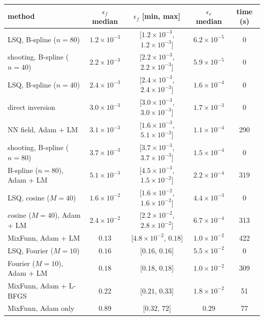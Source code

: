 \begin{tabular}{lcccc}
\toprule
method & $\epsilon_f$ median & $\epsilon_f$ [min, max] & $\epsilon_r$ median & time (s) \\
\midrule
LSQ, B-spline ($n{=}80$) & $1.2\times10^{-3}$ & [$1.2\times10^{-3}$, $1.2\times10^{-3}$] & $6.2\times10^{-5}$ & 0 \\
shooting, B-spline ($n{=}40$) & $2.2\times10^{-3}$ & [$2.2\times10^{-3}$, $2.2\times10^{-3}$] & $5.9\times10^{-5}$ & 0 \\
LSQ, B-spline ($n{=}40$) & $2.4\times10^{-3}$ & [$2.4\times10^{-3}$, $2.4\times10^{-3}$] & $1.6\times10^{-4}$ & 0 \\
direct inversion & $3.0\times10^{-3}$ & [$3.0\times10^{-3}$, $3.0\times10^{-3}$] & $1.7\times10^{-3}$ & 0 \\
NN field, Adam + LM & $3.1\times10^{-3}$ & [$1.6\times10^{-3}$, $5.1\times10^{-3}$] & $1.1\times10^{-4}$ & 290 \\
shooting, B-spline ($n{=}80$) & $3.7\times10^{-3}$ & [$3.7\times10^{-3}$, $3.7\times10^{-3}$] & $1.5\times10^{-4}$ & 0 \\
B-spline ($n{=}80$), Adam + LM & $5.1\times10^{-3}$ & [$4.5\times10^{-3}$, $1.5\times10^{-2}$] & $2.2\times10^{-4}$ & 319 \\
LSQ, cosine ($M{=}40$) & $1.6\times10^{-2}$ & [$1.6\times10^{-2}$, $1.6\times10^{-2}$] & $4.4\times10^{-3}$ & 0 \\
cosine ($M{=}40$), Adam + LM & $2.4\times10^{-2}$ & [$2.2\times10^{-2}$, $2.8\times10^{-2}$] & $6.7\times10^{-4}$ & 313 \\
MixFunn, Adam + LM & $0.13$ & [$4.8\times10^{-2}$, $0.18$] & $1.0\times10^{-2}$ & 422 \\
LSQ, Fourier ($M{=}10$) & $0.16$ & [$0.16$, $0.16$] & $5.5\times10^{-2}$ & 0 \\
Fourier ($M{=}10$), Adam + LM & $0.18$ & [$0.18$, $0.18$] & $1.0\times10^{-2}$ & 309 \\
MixFunn, Adam + L-BFGS & $0.22$ & [$0.21$, $0.33$] & $1.8\times10^{-2}$ & 51 \\
MixFunn, Adam only & $0.89$ & [$0.32$, $72$] & $0.29$ & 77 \\
\bottomrule
\end{tabular}
